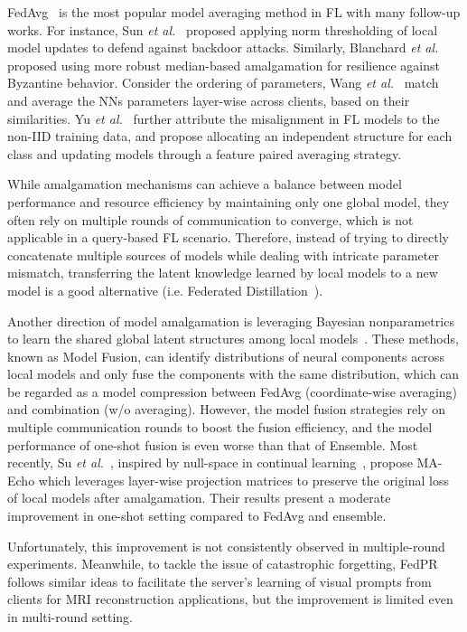 FedAvg~\cite{mcmahan2017communication} is the most popular model averaging method in FL with many follow-up works. 
For instance, Sun \textit{et al.}~\cite{sun2019can} proposed applying norm thresholding of local model updates to defend against backdoor attacks.
Similarly, Blanchard \textit{et al.}~\cite{blanchard2017machine} proposed using more robust median-based amalgamation for resilience against Byzantine behavior.
Consider the ordering of parameters, Wang \textit{et al.}~\cite{wang2020federated} match and average the NNs parameters layer-wise across clients, based on their similarities.
Yu \textit{et al.}~\cite{yu2021fed2} further attribute the misalignment in FL models to the non-IID training data, and propose allocating an independent structure for each class and updating models through a feature paired averaging strategy.

While amalgamation mechanisms can achieve a balance between model performance and resource efficiency by maintaining only one global model, they often rely on multiple rounds of communication to converge, which is not applicable in a query-based FL scenario.
Therefore, instead of trying to directly concatenate multiple sources of models while dealing with intricate parameter mismatch, transferring the latent knowledge learned by local models to a new model is a good alternative (i.e. Federated Distillation~\cite{jeong2018communication, jin2023feddyn}).

Another direction of model amalgamation is leveraging Bayesian nonparametrics to learn the shared global latent structures among local models~\cite{yurochkin2019bayesian, yurochkin2019statistical, lam2021model}. 
These methods, known as Model Fusion, can identify distributions of neural components across local models and only fuse the components with the same distribution, which can be regarded as a model compression between FedAvg (coordinate-wise averaging) and combination (w/o averaging).
However, the model fusion strategies rely on multiple communication rounds to boost the fusion efficiency, and the model performance of one-shot fusion is even worse than that of Ensemble.
Most recently, Su \textit{et al.}~\cite{su2023one}, inspired by null-space in continual learning~\cite{wang2021training, kong2022balancing}, propose MA-Echo which leverages layer-wise projection matrices to preserve the original loss of local models after amalgamation.
Their results present a moderate improvement in one-shot setting compared to FedAvg and ensemble.

Unfortunately, this improvement is not consistently observed in multiple-round experiments.
Meanwhile, to tackle the issue of catastrophic forgetting, FedPR~\cite{feng2023learning} follows similar ideas to facilitate the server's learning of visual prompts from clients for MRI reconstruction applications, but the improvement is limited even in multi-round setting. %

